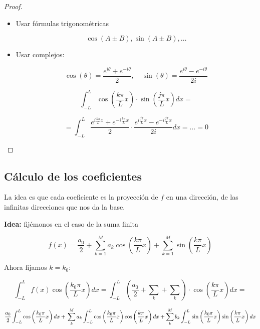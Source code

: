 			\begin{proof}

				\begin{itemize}
					\item Usar fórmulas trigonométricas

						\[\cos(A ± B), \sin(A ± B), …\]

					\item Usar complejos:

						\[ \cos(\theta) = \frac{e^{i\theta} + e^{-i\theta} }{2}, \quad \sin(\theta) = \frac{e^{i\theta} - e^{-i\theta} }{2i}\]

						\[  \int^{L}_{-L} \cos \left( \frac{k \pi}{L} x \right) \cdot \sin \left( \frac{j \pi}{L} x \right) dx = \]

						\[ = \int^L_{-L} \frac{e^{i\frac{k\pi}{L}x} + e^{-i\frac{k\pi}{L}x} }{2} \cdot \frac{e^{i\frac{j\pi}{L}x} - e^{-i\frac{j\pi}{L}x} }{2i} dx = … = 0 \]

				\end{itemize}

			\end{proof}




	\subsection{Cálculo de los coeficientes}

		La idea es que cada coeficiente es la proyección de $f$ en una dirección, de las infinitas direcciones que nos da la base.

		\textbf{Idea:} fijémonos en el caso de la suma finita

		\[ f(x) = \frac{a_0}{2}+ \sum_{k=1}^M a_k \cos \left( \frac{k \pi}{L} x \right) + \sum_{k=1}^M \sin \left( \frac{k \pi}{L} x \right)\]

		Ahora fijamos $k=k_0$:

		\[ \int^L_{-L} f(x) \cos \left( \frac{k_0 \pi}{L} x \right) dx = \int^L_{-L} (\frac{a_0}{2} + \sum_k + \sum_k ) \cdot  \cos \left( \frac{k \pi}{L} x \right) dx  = \]

		\[ \frac{a_0}{2}  \int^L_{-L} \cos \left( \frac{k_0 \pi}{L} x \right) dx +\\
		\sum_k^M a_k \int^L_{-L} \cos \left( \frac{k_0 \pi}{L} x \right) \cos \left( \frac{k \pi}{L} x \right) dx +
		\sum_k^M b_k \int^L_{-L} \sin \left( \frac{k_0 \pi}{L} x \right) \sin \left( \frac{k \pi}{L} x \right) dx \]

